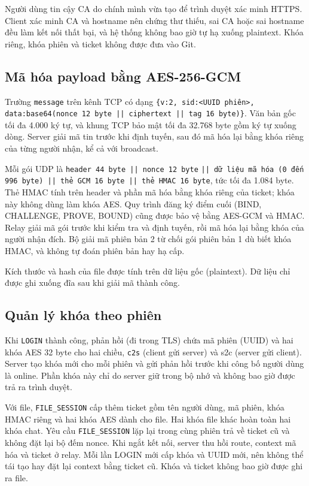 Người dùng tin cậy CA do chính mình vừa tạo để trình duyệt xác minh HTTPS. Client xác minh CA và hostname nên chứng thư thiếu, sai CA hoặc sai hostname đều làm kết nối thất bại, và hệ thống không bao giờ tự hạ xuống plaintext. Khóa riêng, khóa phiên và ticket không được đưa vào Git.

\subsection{Mã hóa payload bằng AES-256-GCM}
Trường \texttt{message} trên kênh TCP có dạng \texttt{\{v:2, sid:<UUID phiên>, data:base64(nonce 12 byte || ciphertext || tag 16 byte)\}}. Văn bản gốc tối đa 4.000 ký tự, và khung TCP bảo mật tối đa 32.768 byte gồm ký tự xuống dòng. Server giải mã tin trước khi định tuyến, sau đó mã hóa lại bằng khóa riêng của từng người nhận, kể cả với broadcast.

Mỗi gói UDP là \texttt{header 44 byte || nonce 12 byte} \texttt{|| dữ liệu mã hóa (0 đến} \texttt{996 byte) || thẻ GCM 16 byte || thẻ HMAC 16 byte}, tức tối đa 1.084 byte. Thẻ HMAC tính trên header và phần mã hóa bằng khóa riêng của ticket; khóa này không dùng làm khóa AES. Quy trình đăng ký điểm cuối (BIND, CHALLENGE, PROVE, BOUND) cũng được bảo vệ bằng AES-GCM và HMAC. Relay giải mã gói trước khi kiểm tra và định tuyến, rồi mã hóa lại bằng khóa của người nhận đích. Bộ giải mã phiên bản 2 từ chối gói phiên bản 1 dù biết khóa HMAC, và không tự đoán phiên bản hay hạ cấp.

Kích thước và hash của file được tính trên dữ liệu gốc (plaintext). Dữ liệu chỉ được ghi xuống đĩa sau khi giải mã thành công.

\subsection{Quản lý khóa theo phiên}
Khi \texttt{LOGIN} thành công, phản hồi (đi trong TLS) chứa mã phiên (UUID) và hai khóa AES 32 byte cho hai chiều, \texttt{c2s} (client gửi server) và s2c (server gửi client). Server tạo khóa mới cho mỗi phiên và gửi phản hồi trước khi công bố người dùng là online. Phần khóa này chỉ do server giữ trong bộ nhớ và không bao giờ được trả ra trình duyệt.

Với file, \texttt{FILE\_SESSION} cấp thêm ticket gồm tên người dùng, mã phiên, khóa HMAC riêng và hai khóa AES dành cho file. Hai khóa file khác hoàn toàn hai khóa chat. Yêu cầu \texttt{FILE\_SESSION} lặp lại trong cùng phiên trả về ticket cũ và không đặt lại bộ đếm nonce. Khi ngắt kết nối, server thu hồi route, context mã hóa và ticket ở relay. Mỗi lần LOGIN mới cấp khóa và UUID mới, nên không thể tái tạo hay đặt lại context bằng ticket cũ. Khóa và ticket không bao giờ được ghi ra file.

